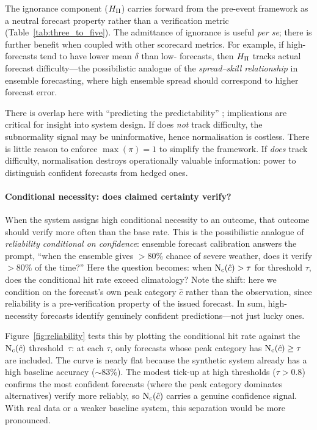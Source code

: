 The ignorance component ($H_{\Pi}$) carries forward from the pre-event
framework as a neutral forecast property
rather than a verification metric
(Table~\ref{tab:three_to_five}).
The admittance of ignorance is useful \textit{per se};
there is further benefit when coupled with
other scorecard metrics.
For example, if high-\ign{} forecasts tend to have lower
mean $\delta$ than low-\ign{} forecasts, then $H_{\Pi}$ tracks actual
forecast difficulty---the possibilistic analogue of the
\textit{spread--skill relationship} in ensemble forecasting, where high
ensemble spread should correspond to higher forecast error.

There is overlap here with
``predicting the predictability'' \citep{Coleman2024-hf};
implications are critical for insight
into system design.
If \ign{} does \emph{not} track difficulty,
the subnormality signal may be uninformative,
hence normalisation is costless.
There is little reason to enforce
$\max(\pi) = 1$ to simplify the framework. If \ign{} \emph{does}
track difficulty, normalisation destroys operationally valuable
information: power to distinguish confident forecasts from hedged ones.

\paragraph{Conditional necessity: does claimed certainty verify?}

When the system assigns high conditional necessity to an outcome, that
outcome should verify more often than the base rate. This is the
possibilistic analogue of \textit{reliability conditional on
confidence}: ensemble forecast calibration answers
the prompt, ``when the ensemble
gives ${>}80\%$ chance of severe weather,
does it verify ${>}80\%$ of the time?''
Here the question becomes:
when $\mathrm{N}_{\mathrm{c}}(\hat{c}) > \tau$ for
threshold $\tau$, does the conditional hit rate exceed climatology?
Note the shift: here we condition on the forecast's own peak category
$\hat{c}$ rather than the observation, since reliability is a
pre-verification property of the issued forecast.
In sum, high-necessity forecasts identify genuinely confident
predictions---not just lucky ones.

Figure~\ref{fig:reliability} tests this by plotting the conditional hit
rate against the $\mathrm{N}_{\mathrm{c}}(\hat{c})$ threshold~$\tau$: at each $\tau$, only
forecasts whose peak category has $\mathrm{N}_{\mathrm{c}}(\hat{c}) \geq \tau$ are included.
The curve is nearly flat because the synthetic system already has a high
baseline accuracy (${\sim}83\%$). The modest tick-up at high
thresholds ($\tau > 0.8$) confirms the most
confident forecasts (where the peak category dominates 
alternatives) verify more reliably, so $\mathrm{N}_{\mathrm{c}}(\hat{c})$ carries a genuine
confidence signal. With real data or a weaker baseline system, this
separation would be more pronounced.

